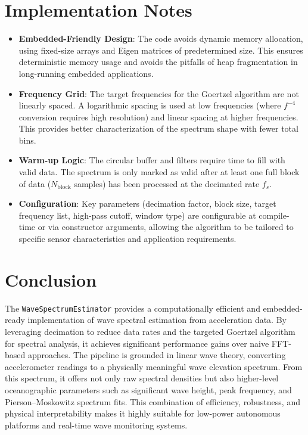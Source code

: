 \documentclass[11pt,letterpaper]{article}
\begin{document}
    \section{Implementation Notes}
    \label{sec:implementation}
    \begin{itemize}
        \item \textbf{Embedded-Friendly Design}: The code avoids dynamic memory allocation, using fixed-size arrays and Eigen matrices of predetermined size. This ensures deterministic memory usage and avoids the pitfalls of heap fragmentation in long-running embedded applications.
        \item \textbf{Frequency Grid}: The target frequencies for the Goertzel algorithm are not linearly spaced. A logarithmic spacing is used at low frequencies (where $f^{-4}$ conversion requires high resolution) and linear spacing at higher frequencies. This provides better characterization of the spectrum shape with fewer total bins.
        \item \textbf{Warm-up Logic}: The circular buffer and filters require time to fill with valid data. The spectrum is only marked as valid after at least one full block of data ($N_\text{block}$ samples) has been processed at the decimated rate $f_s$.
        \item \textbf{Configuration}: Key parameters (decimation factor, block size, target frequency list, high-pass cutoff, window type) are configurable at compile-time or via constructor arguments, allowing the algorithm to be tailored to specific sensor characteristics and application requirements.
    \end{itemize}

    \section{Conclusion}
    The \texttt{WaveSpectrumEstimator} provides a computationally efficient and embedded-ready implementation of wave spectral estimation from acceleration data. By leveraging decimation to reduce data rates and the targeted Goertzel algorithm for spectral analysis, it achieves significant performance gains over naive FFT-based approaches. The pipeline is grounded in linear wave theory, converting accelerometer readings to a physically meaningful wave elevation spectrum. From this spectrum, it offers not only raw spectral densities but also higher-level oceanographic parameters such as significant wave height, peak frequency, and Pierson--Moskowitz spectrum fits. This combination of efficiency, robustness, and physical interpretability makes it highly suitable for low-power autonomous platforms and real-time wave monitoring systems.

%
%
\end{document}

